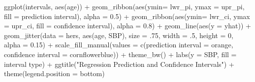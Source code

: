 \documentclass[
  letterpaper,
  DIV=11,
  numbers=noendperiod]{scrreport}
\newenvironment{Shaded}{\begin{snugshade}}{\end{snugshade}}
\newcommand{\AttributeTok}[1]{\textcolor[rgb]{0.40,0.45,0.13}{#1}}
\newcommand{\DecValTok}[1]{\textcolor[rgb]{0.68,0.00,0.00}{#1}}
\newcommand{\FloatTok}[1]{\textcolor[rgb]{0.68,0.00,0.00}{#1}}
\newcommand{\FunctionTok}[1]{\textcolor[rgb]{0.28,0.35,0.67}{#1}}
\newcommand{\NormalTok}[1]{\textcolor[rgb]{0.00,0.23,0.31}{#1}}
\newcommand{\OtherTok}[1]{\textcolor[rgb]{0.00,0.23,0.31}{#1}}
\newcommand{\SpecialCharTok}[1]{\textcolor[rgb]{0.37,0.37,0.37}{#1}}
\newcommand{\StringTok}[1]{\textcolor[rgb]{0.13,0.47,0.30}{#1}}
\begin{document}
\begin{Shaded}
\begin{Highlighting}[]
\FunctionTok{ggplot}\NormalTok{(intervals, }\FunctionTok{aes}\NormalTok{(age)) }\SpecialCharTok{+} 
  \FunctionTok{geom\_ribbon}\NormalTok{(}\FunctionTok{aes}\NormalTok{(}\AttributeTok{ymin=}\NormalTok{ lwr\_pi, }\AttributeTok{ymax =}\NormalTok{ upr\_pi, }\AttributeTok{fill =} \StringTok{\textquotesingle{}prediction interval\textquotesingle{}}\NormalTok{), }\AttributeTok{alpha =} \FloatTok{0.5}\NormalTok{) }\SpecialCharTok{+} 
  \FunctionTok{geom\_ribbon}\NormalTok{(}\FunctionTok{aes}\NormalTok{(}\AttributeTok{ymin=}\NormalTok{ lwr\_ci, }\AttributeTok{ymax =}\NormalTok{ upr\_ci, }\AttributeTok{fill =} \StringTok{\textquotesingle{}confidence interval\textquotesingle{}}\NormalTok{), }\AttributeTok{alpha =} \FloatTok{0.8}\NormalTok{) }\SpecialCharTok{+} 
  \FunctionTok{geom\_line}\NormalTok{(}\FunctionTok{aes}\NormalTok{(}\AttributeTok{y =}\NormalTok{ yhat)) }\SpecialCharTok{+} 
  \FunctionTok{geom\_jitter}\NormalTok{(}\AttributeTok{data =}\NormalTok{ hers, }\FunctionTok{aes}\NormalTok{(age, SBP), }\AttributeTok{size =}\NormalTok{ .}\DecValTok{75}\NormalTok{, }\AttributeTok{width =}\NormalTok{ .}\DecValTok{5}\NormalTok{, }\AttributeTok{height =} \DecValTok{0}\NormalTok{, }\AttributeTok{alpha =} \FloatTok{0.15}\NormalTok{) }\SpecialCharTok{+} 
  \FunctionTok{scale\_fill\_manual}\NormalTok{(}\AttributeTok{values =} \FunctionTok{c}\NormalTok{(}\StringTok{\textquotesingle{}prediction interval\textquotesingle{}} \OtherTok{=} \StringTok{\textquotesingle{}orange\textquotesingle{}}\NormalTok{, }\StringTok{\textquotesingle{}confidence interval\textquotesingle{}} \OtherTok{=} \StringTok{\textquotesingle{}cornflowerblue\textquotesingle{}}\NormalTok{)) }\SpecialCharTok{+} 
  \FunctionTok{theme\_bw}\NormalTok{() }\SpecialCharTok{+}
  \FunctionTok{labs}\NormalTok{(}\AttributeTok{y =} \StringTok{\textquotesingle{}SBP\textquotesingle{}}\NormalTok{, }\AttributeTok{fill =} \StringTok{\textquotesingle{}interval type\textquotesingle{}}\NormalTok{) }\SpecialCharTok{+} 
  \FunctionTok{ggtitle}\NormalTok{(}\StringTok{"Regression Prediction and Confidence Intervals"}\NormalTok{) }\SpecialCharTok{+} 
  \FunctionTok{theme}\NormalTok{(}\AttributeTok{legend.position =} \StringTok{\textquotesingle{}bottom\textquotesingle{}}\NormalTok{)}
\end{Highlighting}
\end{Shaded}
\end{document}
